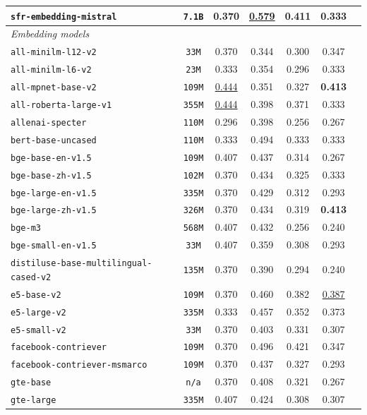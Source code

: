 \documentclass[11pt]{article}
\begin{document}
\begin{table}[htbp]
{\begin{tabular}{lcccccc}
\texttt{sfr-embedding-mistral} & \texttt{7.1B} & \textbf{0.370} & \underline{0.579} & 0.411 & \textbf{0.333} \\
\midrule
\multicolumn{6}{l}{\textit{Embedding models}} \\
\midrule
\texttt{all-minilm-l12-v2} & \texttt{33M} & 0.370 & 0.344 & 0.300 & 0.347 \\
\texttt{all-minilm-l6-v2} & \texttt{23M} & 0.333 & 0.354 & 0.296 & 0.333 \\
\texttt{all-mpnet-base-v2} & \texttt{109M} & \underline{0.444} & 0.351 & 0.327 & \textbf{0.413} \\
\texttt{all-roberta-large-v1} & \texttt{355M} & \underline{0.444} & 0.398 & 0.371 & 0.333 \\
\texttt{allenai-specter} & \texttt{110M} & 0.296 & 0.398 & 0.256 & 0.267 \\
\texttt{bert-base-uncased} & \texttt{110M} & 0.333 & 0.494 & 0.333 & 0.333 \\
\texttt{bge-base-en-v1.5} & \texttt{109M} & 0.407 & 0.437 & 0.314 & 0.267 \\
\texttt{bge-base-zh-v1.5} & \texttt{102M} & 0.370 & 0.434 & 0.325 & 0.333 \\
\texttt{bge-large-en-v1.5} & \texttt{335M} & 0.370 & 0.429 & 0.312 & 0.293 \\
\texttt{bge-large-zh-v1.5} & \texttt{326M} & 0.370 & 0.434 & 0.319 & \textbf{0.413} \\
\texttt{bge-m3} & \texttt{568M} & 0.407 & 0.432 & 0.256 & 0.240 \\
\texttt{bge-small-en-v1.5} & \texttt{33M} & 0.407 & 0.359 & 0.308 & 0.293 \\
\texttt{distiluse-base-multilingual-cased-v2} & \texttt{135M} & 0.370 & 0.390 & 0.294 & 0.240 \\
\texttt{e5-base-v2} & \texttt{109M} & 0.370 & 0.460 & 0.382 & \underline{0.387} \\
\texttt{e5-large-v2} & \texttt{335M} & 0.333 & 0.457 & 0.352 & 0.373 \\
\texttt{e5-small-v2} & \texttt{33M} & 0.370 & 0.403 & 0.331 & 0.307 \\
\texttt{facebook-contriever} & \texttt{109M} & 0.370 & 0.496 & 0.421 & 0.347 \\
\texttt{facebook-contriever-msmarco} & \texttt{109M} & 0.370 & 0.437 & 0.327 & 0.293 \\
\texttt{gte-base} & \texttt{n/a} & 0.370 & 0.408 & 0.321 & 0.267 \\
\texttt{gte-large} & \texttt{335M} & 0.407 & 0.424 & 0.308 & 0.307 \\

\end{tabular}}
\end{table}
\end{document}

